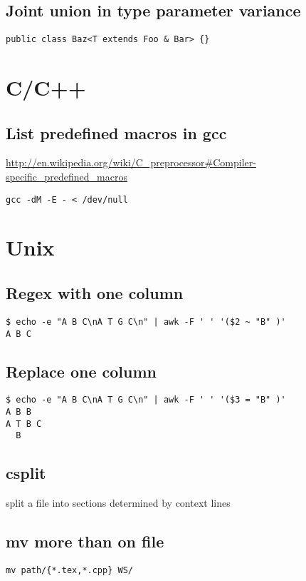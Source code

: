 \documentclass[12pt]{article}
\begin{document}
\subsection{Joint union in type parameter variance}
\begin{verbatim}
public class Baz<T extends Foo & Bar> {}
\end{verbatim}
\section{C/C++}
\subsection{List predefined macros in gcc}
\url{http://en.wikipedia.org/wiki/C_preprocessor#Compiler-specific_predefined_macros}
\begin{verbatim}
gcc -dM -E - < /dev/null
\end{verbatim}

\section{Unix}
\subsection{Regex with one column}
\begin{verbatim}
$ echo -e "A B C\nA T G C\n" | awk -F ' ' '($2 ~ "B" )'
A B C
\end{verbatim}
\subsection{Replace one column}
\begin{verbatim}
$ echo -e "A B C\nA T G C\n" | awk -F ' ' '($3 = "B" )'
A B B
A T B C
  B

\end{verbatim}
\subsection{csplit }
split a file into sections determined by context lines

\subsection{mv more than on file}
\begin{verbatim}
mv path/{*.tex,*.cpp} WS/
\end{verbatim}
\end{document}
